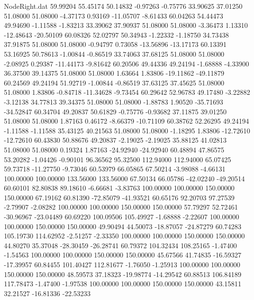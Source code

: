 \begin{filecontents}{NodeRight.dat}
  59.99204   55.45174   50.14832    -0.97263   -0.75776   33.90625   37.01250   51.08000   51.08000   -4.37173    0.93169  -11.05707   -8.61433
  60.04263   54.44473   49.94690    -1.11588   -1.83213   33.39062   37.90937   51.08000   51.08000   -3.36473    1.13310  -12.48643  -20.50109
  60.08326   52.02797   50.34943    -1.22332   -1.18750   34.73438   37.91875   51.08000   51.08000   -0.94797    0.73058  -13.56896  -13.17173
  60.13391   53.16925   50.78613    -1.00844   -0.86519   33.74063   37.68125   51.08000   51.08000   -2.08925    0.29387  -11.44173   -9.81642
  60.20506   49.44336   49.24194    -1.68888   -4.33900   36.37500   39.14375   51.08000   51.08000    1.63664    1.83806  -19.11862  -49.11879
  60.24569   49.24194   51.92719    -1.00844   -0.86519   37.63125   37.45625   51.08000   51.08000    1.83806   -0.84718  -11.34628   -9.73454
  60.29642   52.96783   49.17480    -3.22882   -3.12138   34.77813   39.34375   51.08000   51.08000   -1.88783    1.90520  -35.71693  -34.52847
  60.34704   49.20837   50.61829    -0.75776   -0.93682   37.11875   39.01250   51.08000   51.08000    1.87163    0.46172   -8.66379  -10.71109
  60.38762   52.26295   49.24194    -1.11588   -1.11588   35.43125   40.21563   51.08000   51.08000   -1.18295    1.83806  -12.72610  -12.72610
  60.43830   50.88676   49.20837    -2.19025   -2.19025   35.88125   41.02813   51.08000   51.08000    0.19324    1.87163  -24.92940  -24.92940
  60.48894   47.86575   53.20282    -1.04426   -0.90101   96.36562   95.32500  112.94000  112.94000   65.07425   59.73718  -11.27750   -9.73046
  60.53979   66.05865   67.50214    -3.98088   -4.66131  100.00000  100.00000  133.56000  133.56000   67.50134   66.05786  -42.02240  -49.20514
  60.60101   82.80838   89.18610    -6.66681   -3.83763  100.00000  100.00000  150.00000  150.00000   67.19162   60.81390  -72.85079  -41.93521
  60.65176   92.20703   97.27539    -2.79907   -2.08282  100.00000  100.00000  150.00000  150.00000   57.79297   52.72461  -30.96967  -23.04489
  60.69220  100.09506  105.49927    -1.68888   -2.22607  100.00000  100.00000  150.00000  150.00000   49.90494   44.50073  -18.87057  -24.87279
  60.74283  105.19730  114.62952    -2.51257   -2.33350  100.00000  100.00000  150.00000  150.00000   44.80270   35.37048  -28.30459  -26.28741
  60.79372  104.32434  108.25165    -1.47400   -1.54563  100.00000  100.00000  150.00000  150.00000   45.67566   41.74835  -16.59327  -17.39957
  60.84455  101.40427  112.81677    -1.76050   -1.25913  100.00000  100.00000  150.00000  150.00000   48.59573   37.18323  -19.98774  -14.29542
  60.88513  106.84189  117.78473    -1.47400   -1.97538  100.00000  100.00000  150.00000  150.00000   43.15811   32.21527  -16.81336  -22.53233

\end{filecontents}
